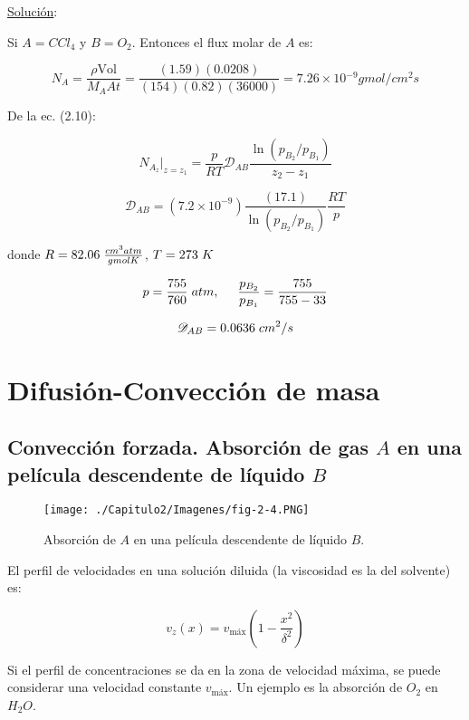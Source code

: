 \underline{Solución}:

Si $A=CCl_4$ y $B=O_2$. Entonces el flux molar de $A$ es:

$$N_A = \frac{\rho \text{Vol}}{M_A At} = \frac{(1.59)(0.0208)}{(154)(0.82)(36000)} = 7.26 \times 10­^{-9} gmol/cm^2 s$$ 

De la ec. (2.10):

$$N_{A_z} | _{z=z_1} = \frac{p}{RT} \mathscr{D}_{AB} \frac{\ln{(p_{B_2}/p_{B_1})}}{z_2 - z_1}$$

$$\mathscr{D}_{AB} = (7.2 \times 10^{-9})\frac{(17.1)}{\ln{(p_{B_2}/p_{B_1})}} \frac{RT}{p}$$

donde $R = 82.06 \hspace{0.1cm} \frac{cm^3 atm}{gmol K}$, $T = 273 \hspace{0.1cm} K$

$$p = \frac{755}{760} \hspace{0.1cm} atm , \hspace{0.5cm} \frac{p_{B_2}}{p_{B_1}} = \frac{755}{755-33}$$

$$\mathscr{D}_{AB} = 0.0636 \hspace{0.1cm} cm^2/s$$
	
\section{Difusión-Convección de masa}

\subsection{Convección forzada. Absorción de gas $A$ en una película descendente de líquido $B$}

\begin{figure}[H]
	\centering
	\texttt{[image: ./Capitulo2/Imagenes/fig-2-4.PNG]}
	\caption{Absorción de $A$ en una película descendente de líquido $B$.}
\end{figure}

El perfil de velocidades en una solución diluida (la viscosidad es la del solvente) es:

\begin{equation}
v_z(x) = v_{\text{máx}} \left( 1 - \frac{x^2}{\delta^2} \right)
\end{equation}

Si el perfil de concentraciones se da en la zona de velocidad máxima, se puede considerar una velocidad constante $v_{\text{máx}}$. Un ejemplo es la absorción de $O_2$ en $H_2O$.

